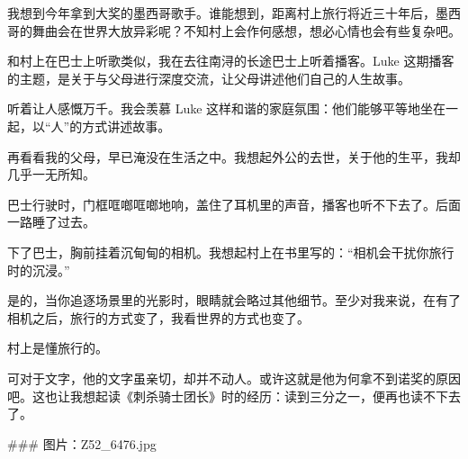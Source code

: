 我想到今年拿到大奖的墨西哥歌手。谁能想到，距离村上旅行将近三十年后，墨西哥的舞曲会在世界大放异彩呢？不知村上会作何感想，想必心情也会有些复杂吧。

和村上在巴士上听歌类似，我在去往南浔的长途巴士上听着播客。Luke 这期播客的主题，是关于与父母进行深度交流，让父母讲述他们自己的人生故事。

听着让人感慨万千。我会羡慕 Luke 这样和谐的家庭氛围：他们能够平等地坐在一起，以“人”的方式讲述故事。

再看看我的父母，早已淹没在生活之中。我想起外公的去世，关于他的生平，我却几乎一无所知。

巴士行驶时，门框哐啷哐啷地响，盖住了耳机里的声音，播客也听不下去了。后面一路睡了过去。

下了巴士，胸前挂着沉甸甸的相机。我想起村上在书里写的：“相机会干扰你旅行时的沉浸。”

是的，当你追逐场景里的光影时，眼睛就会略过其他细节。至少对我来说，在有了相机之后，旅行的方式变了，我看世界的方式也变了。

村上是懂旅行的。

可对于文字，他的文字虽亲切，却并不动人。或许这就是他为何拿不到诺奖的原因吧。这也让我想起读《刺杀骑士团长》时的经历：读到三分之一，便再也读不下去了。

### 图片：Z52_6476.jpg